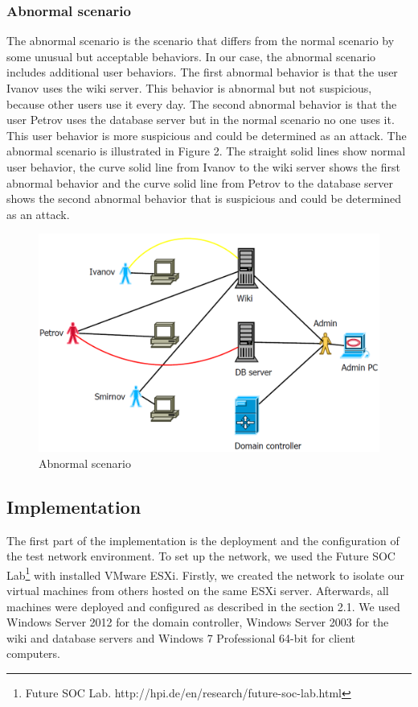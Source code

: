 \subsubsection{Abnormal scenario}
The abnormal scenario is the scenario that differs from the normal scenario by some unusual but acceptable behaviors. In our case, the abnormal scenario includes additional user behaviors. The first abnormal behavior is that the user Ivanov uses the wiki server. This behavior is abnormal but not suspicious, because other users use it every day. The second abnormal behavior is that the user Petrov uses the database server but in the normal scenario no one uses it. This user behavior is more suspicious and could be determined as an attack. The abnormal scenario is illustrated in Figure 2. The straight solid lines show normal user behavior, the curve solid line from Ivanov to the wiki server shows the first abnormal behavior and the curve solid line from Petrov to the database server shows the second abnormal behavior that is suspicious and could be determined as an attack. 
\begin{figure}[ht!]
\centering
\includegraphics[width=\columnwidth]{figures/scenario_abnormal.png}
\caption{Abnormal scenario}
\label{overflow}
\end{figure}

\subsection{Implementation}
The first part of the implementation is the deployment and the configuration of the test network environment. To set up the network, we used the Future SOC Lab\footnote{Future SOC Lab. http://hpi.de/en/research/future-soc-lab.html} with installed VMware ESXi. Firstly, we created the network to isolate our virtual machines from others hosted on the same ESXi server. Afterwards, all machines were deployed and configured as described in the section 2.1. We used Windows Server 2012 for the domain controller, Windows Server 2003 for the wiki and database servers and Windows 7 Professional 64-bit for client computers. 

